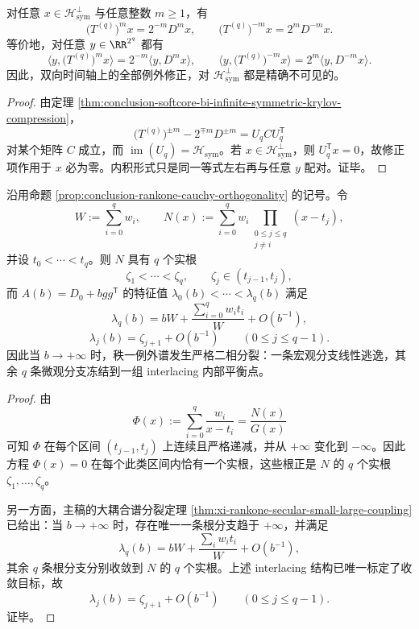 \begin{corollary}[对称扇区之外的双向完全不可见性]\label{cor:conclusion-softcore-bi-infinite-exact-invisibility-off-symmetric-sector}
对任意 \(x\in \mathcal H_{\mathrm{sym}}^\perp\) 与任意整数 \(m\ge 1\)，有
\[
\bigl(T^{(q)}\bigr)^m x=2^{-m}D^m x,
\qquad
\bigl(T^{(q)}\bigr)^{-m}x=2^{m}D^{-m}x.
\]
等价地，对任意 \(y\in \RR^{2^q}\) 都有
\[
\langle y,\bigl(T^{(q)}\bigr)^m x\rangle
=
2^{-m}\langle y,D^m x\rangle,
\qquad
\langle y,\bigl(T^{(q)}\bigr)^{-m}x\rangle
=
2^{m}\langle y,D^{-m}x\rangle.
\]
因此，双向时间轴上的全部例外修正，对 \(\mathcal H_{\mathrm{sym}}^\perp\) 都是精确不可见的。
\end{corollary}
\begin{proof}
由定理 \ref{thm:conclusion-softcore-bi-infinite-symmetric-krylov-compression}，
\[
\bigl(T^{(q)}\bigr)^{\pm m}-2^{\mp m}D^{\pm m}
=
U_q C U_q^{\mathsf T}
\]
对某个矩阵 \(C\) 成立，而 \(\operatorname{im}(U_q)=\mathcal H_{\mathrm{sym}}\)。若 \(x\in \mathcal H_{\mathrm{sym}}^\perp\)，则 \(U_q^{\mathsf T}x=0\)，故修正项作用于 \(x\) 必为零。内积形式只是同一等式左右再与任意 \(y\) 配对。证毕。
\end{proof}

\begin{theorem}[秩一例外谱的大耦合二相分裂]\label{thm:conclusion-rankone-large-coupling-two-phase-separation}
沿用命题 \ref{prop:conclusion-rankone-cauchy-orthogonality} 的记号。令
\[
W:=\sum_{i=0}^{q}w_i,
\qquad
N(x):=\sum_{i=0}^{q}w_i\!\!\prod_{\substack{0\le j\le q\\ j\ne i}}\!\!(x-t_j),
\]
并设 \(t_0<\cdots<t_q\)。则 \(N\) 具有 \(q\) 个实根
\[
\zeta_1<\cdots<\zeta_q,
\qquad
\zeta_j\in(t_{j-1},t_j),
\]
而 \(A(b)=D_0+bgg^{\mathsf T}\) 的特征值 \(\lambda_0(b)<\cdots<\lambda_q(b)\) 满足
\[
\lambda_q(b)=bW+\frac{\sum_{i=0}^{q}w_it_i}{W}+O(b^{-1}),
\]
\[
\lambda_j(b)=\zeta_{j+1}+O(b^{-1})
\qquad (0\le j\le q-1).
\]
因此当 \(b\to+\infty\) 时，秩一例外谱发生严格二相分裂：一条宏观分支线性逃逸，其余 \(q\) 条微观分支冻结到一组 interlacing 内部平衡点。
\end{theorem}
\begin{proof}
由
\[
\Phi(x):=\sum_{i=0}^{q}\frac{w_i}{x-t_i}
=\frac{N(x)}{G(x)}
\]
可知 \(\Phi\) 在每个区间 \((t_{j-1},t_j)\) 上连续且严格递减，并从 \(+\infty\) 变化到 \(-\infty\)。因此方程 \(\Phi(x)=0\) 在每个此类区间内恰有一个实根，这些根正是 \(N\) 的 \(q\) 个实根 \(\zeta_1,\dots,\zeta_q\)。

另一方面，主稿的大耦合谱分裂定理 \ref{thm:xi-rankone-secular-small-large-coupling} 已给出：当 \(b\to+\infty\) 时，存在唯一一条根分支趋于 \(+\infty\)，并满足
\[
\lambda_q(b)=bW+\frac{\sum_i w_i t_i}{W}+O(b^{-1}),
\]
其余 \(q\) 条根分支分别收敛到 \(N\) 的 \(q\) 个实根。上述 interlacing 结构已唯一标定了收敛目标，故
\[
\lambda_j(b)=\zeta_{j+1}+O(b^{-1})
\qquad (0\le j\le q-1).
\]
证毕。
\end{proof}

